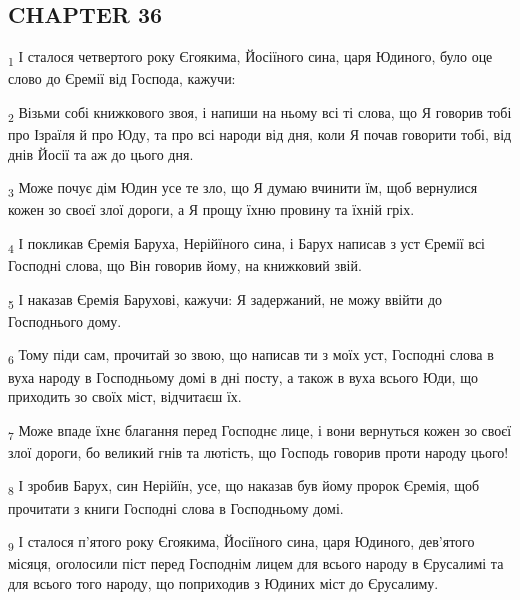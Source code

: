 \subsection{CHAPTER 36}
\begin{tcolorbox}
\textsubscript{1} І сталося четвертого року Єгоякима, Йосіїного сина, царя Юдиного, було оце слово до Єремії від Господа, кажучи:
\end{tcolorbox}
\begin{tcolorbox}
\textsubscript{2} Візьми собі книжкового звоя, і напиши на ньому всі ті слова, що Я говорив тобі про Ізраїля й про Юду, та про всі народи від дня, коли Я почав говорити тобі, від днів Йосії та аж до цього дня.
\end{tcolorbox}
\begin{tcolorbox}
\textsubscript{3} Може почує дім Юдин усе те зло, що Я думаю вчинити їм, щоб вернулися кожен зо своєї злої дороги, а Я прощу їхню провину та їхній гріх.
\end{tcolorbox}
\begin{tcolorbox}
\textsubscript{4} І покликав Єремія Баруха, Нерійїного сина, і Барух написав з уст Єремії всі Господні слова, що Він говорив йому, на книжковий звій.
\end{tcolorbox}
\begin{tcolorbox}
\textsubscript{5} І наказав Єремія Барухові, кажучи: Я задержаний, не можу ввійти до Господнього дому.
\end{tcolorbox}
\begin{tcolorbox}
\textsubscript{6} Тому піди сам, прочитай зо звою, що написав ти з моїх уст, Господні слова в вуха народу в Господньому домі в дні посту, а також в вуха всього Юди, що приходить зо своїх міст, відчитаєш їх.
\end{tcolorbox}
\begin{tcolorbox}
\textsubscript{7} Може впаде їхнє благання перед Господнє лице, і вони вернуться кожен зо своєї злої дороги, бо великий гнів та лютість, що Господь говорив проти народу цього!
\end{tcolorbox}
\begin{tcolorbox}
\textsubscript{8} І зробив Барух, син Нерійїн, усе, що наказав був йому пророк Єремія, щоб прочитати з книги Господні слова в Господньому домі.
\end{tcolorbox}
\begin{tcolorbox}
\textsubscript{9} І сталося п'ятого року Єгоякима, Йосіїного сина, царя Юдиного, дев'ятого місяця, оголосили піст перед Господнім лицем для всього народу в Єрусалимі та для всього того народу, що поприходив з Юдиних міст до Єрусалиму.
\end{tcolorbox}
